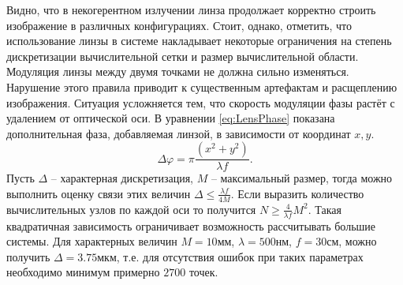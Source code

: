 Видно, что в некогерентном излучении линза продолжает корректно строить изображение в различных конфигурациях. Стоит, однако, отметить, что использование линзы в системе накладывает некоторые ограничения на степень дискретизации вычислительной сетки и размер вычислительной области. Модуляция линзы между двумя точками не должна сильно изменяться. Нарушение этого правила приводит к существенным артефактам и расщеплению изображения. Ситуация усложняется тем, что скорость модуляции фазы растёт с удалением от оптической оси. В уравнении \ref{eq:LensPhase} показана дополнительная фаза, добавляемая линзой, в зависимости от координат $x,y$.
\begin{equation}\label{eq:LensPhase}
	\Delta\varphi = \pi\frac{\left(x^2 +y^2\right)}{\lambda f}.
\end{equation}
Пусть $\Delta$ -- характерная дискретизация, $M$ -- максимальный размер, тогда можно выполнить оценку связи этих величин $\Delta \le \frac{\lambda f}{4M}$. Если выразить количество вычислительных узлов по каждой оси то получится $N \ge \frac{4}{\lambda f} M^2$. Такая квадратичная зависимость	 ограничивает возможность рассчитывать большие системы. Для характерных величин $M=10$мм, $\lambda=500$нм, $f=30$см, можно получить $\Delta=3.75$мкм, т.е. для отсутствия ошибок при таких параметрах необходимо минимум примерно $2700$ точек.
